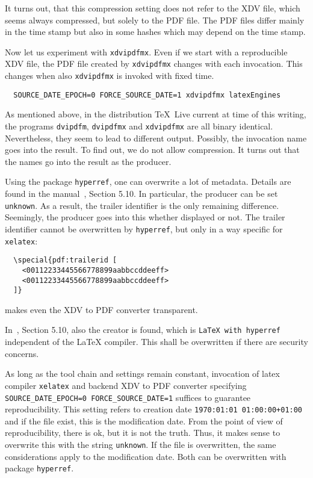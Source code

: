 \documentclass[a4paper, english]{article}%
\newcommand{\xelatex}{\texttt{xelatex}}
\newcommand{\texlive}{\TeX~Live}
\begin{document}
It turns out, that this compression setting does not refer to the XDV file, 
which seems always compressed, but solely to the PDF file. 
The PDF files differ mainly in the time stamp 
but also in some hashes which may depend on the time stamp. 

Now let us experiment with \texttt{xdvipdfmx}. 
Even if we start with a reproducible XDV file, 
the PDF file created by \texttt{xdvipdfmx} 
changes with each invocation. 
This changes when also \texttt{xdvipdfmx} is invoked with fixed time. 
%
\begin{verbatim}
  SOURCE_DATE_EPOCH=0 FORCE_SOURCE_DATE=1 xdvipdfmx latexEngines
\end{verbatim}

As mentioned above, in the distribution \texlive{} current at time of this writing, 
the programs \texttt{dvipdfm}, \texttt{dvipdfmx} and \texttt{xdvipdfmx} 
are all binary identical. 
Nevertheless, they seem to lead to different output. 
Possibly, the invocation name goes into the result. 
To find out, we do not allow compression. 
It turns out that the names go into the result as the producer. 

Using the package \texttt{hyperref}, 
one can overwrite a lot of metadata. 
Details are found in the manual~\cite{HyperTextP}, Section 5.10. 
In particular, the producer can be set \texttt{unknown}. 
As a result, the trailer identifier is the only remaining difference. 
Seemingly, the producer goes into this whether displayed or not. 
The trailer identifier cannot be overwritten by \texttt{hyperref}, 
but only in a way specific for \xelatex: 
%
\begin{verbatim}
  \special{pdf:trailerid [
    <00112233445566778899aabbccddeeff>
    <00112233445566778899aabbccddeeff>
  ]}  
\end{verbatim}
%
makes even the XDV to PDF converter transparent. 

In~\cite{HyperTextP}, Section 5.10, also the creator is found, 
which is \texttt{LaTeX with hyperref} independent of the \LaTeX{} compiler. 
This shall be overwritten if there are security concerns. 

As long as the tool chain and settings remain constant, 
invocation of latex compiler \xelatex{} and backend XDV to PDF converter 
specifying \texttt{SOURCE\_DATE\_EPOCH=0 FORCE\_SOURCE\_DATE=1} 
suffices to guarantee reproducibility. 
This setting refers to creation date \texttt{1970:01:01 01:00:00+01:00} 
and if the file exist, this is the modification date. 
From the point of view of reproducibility, 
there is ok, but it is not the truth. 
Thus, it makes sense to overwrite this with the string \texttt{unknown}. 
If the file is overwritten, the same considerations apply to the modification date. 
Both can be overwritten with package \texttt{hyperref}. 
\end{document}
